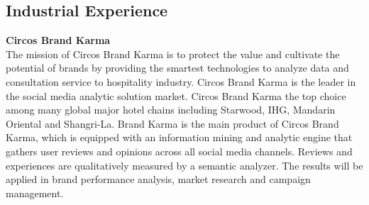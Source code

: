\documentclass[margin,line]{res}
\begin{document}
\begin{resume}
\section{\sc Industrial Experience}
{\bf Circos Brand Karma} 
\\
The mission of Circos Brand Karma is to protect the value and cultivate the potential of 
brands by providing the smartest technologies to analyze data and consultation service
to hospitality industry. 
Circos Brand Karma is the leader in the social media analytic solution market.
Circos Brand Karma the top choice among many global major hotel chains including Starwood, IHG, Mandarin Oriental and Shangri-La.
Brand Karma is the main product of Circos Brand Karma, which is equipped with an
information mining and analytic engine that gathers user reviews and opinions 
across all social media channels. Reviews and experiences
are qualitatively measured by a semantic analyzer.
The results will be applied in brand performance analysis, 
market research and campaign management.


\end{resume}
\end{document}
